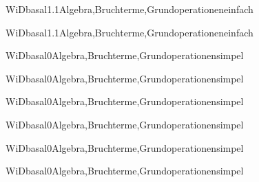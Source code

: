 \documentclass[12pt]{article}
\begin{document}
    \begin{Add}{WiD}{basal1.1}{Algebra,Bruchterme,Grundoperationen}{einfach}
    \solution{ }
    \end{Add}
    \begin{Add}{WiD}{basal1.1}{Algebra,Bruchterme,Grundoperationen}{einfach}
    \end{Add}
    

    \begin{Add}{WiD}{basal0}{Algebra,Bruchterme,Grundoperationen}{simpel}
    \solution{ }
    \end{Add}
    \begin{Add}{WiD}{basal0}{Algebra,Bruchterme,Grundoperationen}{simpel}
    \end{Add}
    

    \begin{Add}{WiD}{basal0}{Algebra,Bruchterme,Grundoperationen}{simpel}
    \solution{ }
    \end{Add}
    \begin{Add}{WiD}{basal0}{Algebra,Bruchterme,Grundoperationen}{simpel}
    \end{Add}
    

    \begin{Add}{WiD}{basal0}{Algebra,Bruchterme,Grundoperationen}{simpel}
    \solution{ }
    \end{Add}
    \begin{Add}{WiD}{basal0}{Algebra,Bruchterme,Grundoperationen}{simpel}
    \end{Add}
    
\end{document}
